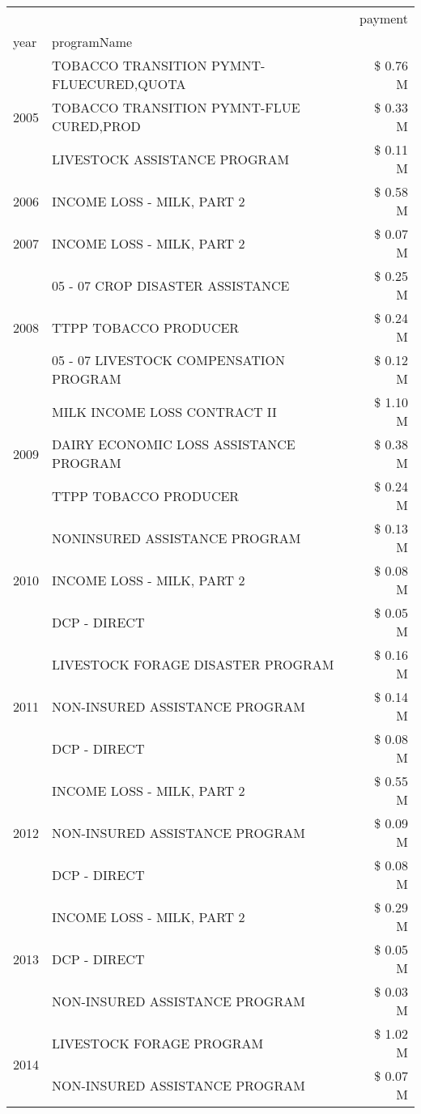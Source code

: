 \begin{tabular}{llr}
\toprule
 &  & payment \\
year & programName &  \\
\midrule
\multirow[t]{3}{*}{2005} & TOBACCO TRANSITION PYMNT-FLUECURED,QUOTA & \$ 0.76 M \\
 & TOBACCO TRANSITION PYMNT-FLUE CURED,PROD & \$ 0.33 M \\
 & LIVESTOCK ASSISTANCE PROGRAM & \$ 0.11 M \\
\cline{1-3}
2006 & INCOME LOSS - MILK, PART 2 & \$ 0.58 M \\
\cline{1-3}
2007 & INCOME LOSS - MILK, PART 2 & \$ 0.07 M \\
\cline{1-3}
\multirow[t]{3}{*}{2008} & 05 - 07 CROP DISASTER ASSISTANCE & \$ 0.25 M \\
 & TTPP TOBACCO PRODUCER & \$ 0.24 M \\
 & 05 - 07 LIVESTOCK COMPENSATION PROGRAM & \$ 0.12 M \\
\cline{1-3}
\multirow[t]{3}{*}{2009} & MILK INCOME LOSS CONTRACT II & \$ 1.10 M \\
 & DAIRY ECONOMIC LOSS ASSISTANCE PROGRAM & \$ 0.38 M \\
 & TTPP TOBACCO PRODUCER & \$ 0.24 M \\
\cline{1-3}
\multirow[t]{3}{*}{2010} & NONINSURED ASSISTANCE PROGRAM & \$ 0.13 M \\
 & INCOME LOSS - MILK, PART 2 & \$ 0.08 M \\
 & DCP - DIRECT & \$ 0.05 M \\
\cline{1-3}
\multirow[t]{3}{*}{2011} & LIVESTOCK FORAGE DISASTER PROGRAM & \$ 0.16 M \\
 & NON-INSURED ASSISTANCE PROGRAM & \$ 0.14 M \\
 & DCP - DIRECT & \$ 0.08 M \\
\cline{1-3}
\multirow[t]{3}{*}{2012} & INCOME LOSS - MILK, PART 2 & \$ 0.55 M \\
 & NON-INSURED ASSISTANCE PROGRAM & \$ 0.09 M \\
 & DCP - DIRECT & \$ 0.08 M \\
\cline{1-3}
\multirow[t]{3}{*}{2013} & INCOME LOSS - MILK, PART 2 & \$ 0.29 M \\
 & DCP - DIRECT & \$ 0.05 M \\
 & NON-INSURED ASSISTANCE PROGRAM & \$ 0.03 M \\
\cline{1-3}
\multirow[t]{3}{*}{2014} & LIVESTOCK FORAGE PROGRAM & \$ 1.02 M \\
 & NON-INSURED ASSISTANCE PROGRAM & \$ 0.07 M \\

\end{tabular}
